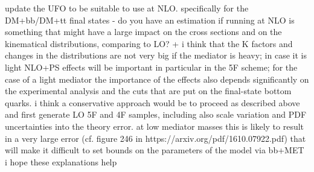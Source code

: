{update the UFO to be suitable to use at NLO. specifically for the
DM+bb/DM+tt final states - do you have an estimation if running at NLO
is something that might have a large impact on the cross sections and on
the kinematical distributions, comparing to LO? + i think that the K
factors and changes in the distributions are not very big if the
mediator is heavy; in case it is light NLO+PS effects will be important
in particular in the 5F scheme; for the case of a light mediator the
importance of the effects also depends significantly on the experimental
analysis and the cuts that are put on the final-state bottom quarks. i
think a conservative approach would be to proceed as described above and
first generate LO 5F and 4F samples, including also scale variation and
PDF uncertainties into the theory error. at low mediator masses this is
likely to result in a very large error (cf. figure 246 in
https://arxiv.org/pdf/1610.07922.pdf) that will make it difficult to set
bounds on the parameters of the model via bb+MET i hope these
explanations help}

